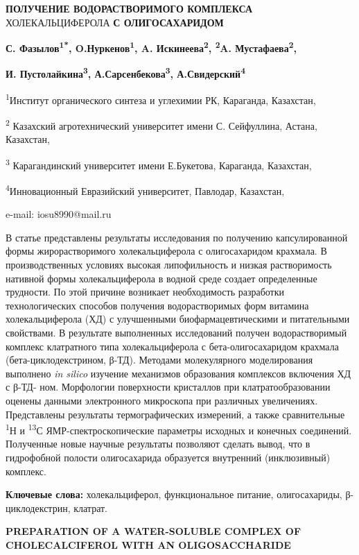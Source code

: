 {\bfseries ПОЛУЧЕНИЕ ВОДОРАСТВОРИМОГО КОМПЛЕКСА} ХОЛЕКАЛЬЦИФЕРОЛА {\bfseries С
ОЛИГОСАХАРИДОМ}

{\bfseries С. Фазылов\textsuperscript{1*}, O.Нуркенов\textsuperscript{1},
A. Искинеева\textsuperscript{2}, \textsuperscript{2}A.
Мустафаева\textsuperscript{2},}

{\bfseries И. Пустолайкина\textsuperscript{3},
А.Сарсенбекова\textsuperscript{3}, А.Свидерский\textsuperscript{4}}

\textsuperscript{1}Институт органического синтеза и углехимии РК,
Караганда, Казахстан,

\textsuperscript{2} Казахский агротехнический университет имени С.
Сейфуллина, Астана, Казахстан,

\textsuperscript{3} Карагандинский университет имени Е.Букетова,
Караганда, Казахстан,

\textsuperscript{4}Инновационный Евразийский университет, Павлодар,
Казахстан,

e-mail: iosu8990@mail.ru

В статье представлены результаты исследования по получению
капсулированной формы жирорастворимого холекальциферола с олигосахаридом
крахмала. В производственных условиях высокая липофильность и низкая
растворимость нативной формы холекальциферола в водной среде создает
определенные трудности. По этой причине возникает необходимость
разработки технологических способов получения водорастворимых форм
витамина холекальциферола (ХД) с улучшенными биофармацевтическими и
питательными свойствами. В результате выполненных исследований получен
водорастворимый комплекс клатратного типа холекальциферола с
бета-олигосахаридом крахмала (бета-циклодекстрином, β-ТД). Методами
молекулярного моделирования выполнено \emph{in silico} изучение
механизмов образования комплексов включения ХД с β-ТД- ном. Морфологии
поверхности кристаллов при клатратообразовании оценены данными
электронного микроскопа при различных увеличениях. Представлены
результаты термографических измерений, а также сравнительные
\textsuperscript{1}Н и \textsuperscript{13}С ЯМР-спектроскопические
параметры исходных и конечных соединений. Полученные новые научные
результаты позволяют сделать вывод, что в гидрофобной полости
олигосахарида образуется внутренний (инклюзивный) комплекс.

{\bfseries Ключевые слова:} холекальциферол, функциональное питание,
олигосахариды, β-циклодекстрин, клатрат.

{\bfseries PREPARATION OF A WATER-SOLUBLE COMPLEX OF CHOLECALCIFEROL WITH
AN OLIGOSACCHARIDE}


